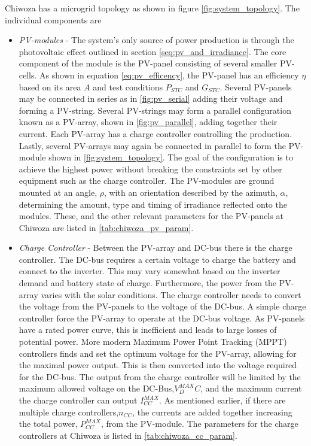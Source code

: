 Chiwoza has a microgrid topology as shown in figure \ref{fig:system_topology}. The individual components are
\begin{itemize}
    \item \textit{PV-modules}   -   The system's only source of power production is through the photovoltaic effect outlined in section \ref{seq:pv_and_irradiance}. The core component of the module is the PV-panel consisting of several smaller PV-cells. As shown in equation \ref{eq:pv_efficency}, the PV-panel has an efficiency $\eta$ based on its area $A$ and test conditions $P_{STC}$ and $G_{STC}$. Several PV-panels may be connected in series as in \ref{fig:pv_serial} adding their voltage and forming a PV-string. Several PV-strings may form a parallel configuration known as a PV-array, shown in \ref{fig:pv_parallel},  adding together their current. Each PV-array has a charge controller controlling the production. Lastly, several PV-arrays may again be connected in parallel to form the PV-module shown in \ref{fig:system_topology}. The goal of the configuration is to achieve the highest power without breaking the constraints set by other equipment such as the charge controller. The PV-modules are ground mounted at an angle, $\rho$, with an orientation described by the azimuth, $\alpha$, determining the amount, type and timing of irradiance reflected onto the modules. These, and the other relevant parameters for the PV-panels at Chiwoza are listed in \autoref{tab:chiwoza_pv_param}.
    
    \item \textit{Charge Controller}   -   Between the PV-array and DC-bus there is the charge controller. The DC-bus requires a certain voltage to charge the battery and connect to the inverter. This may vary somewhat based on the inverter demand and battery state of charge. Furthermore, the power from the PV-array varies with the solar conditions. The charge controller needs to convert the voltage from the PV-panels to the voltage of the DC-bus. A simple charge controller force the PV-array to operate at the DC-bus voltage. As PV-panels have a rated power curve, this is inefficient and leads to large losses of potential power. More modern Maximum Power Point Tracking (MPPT) controllers finds and set the optimum voltage for the PV-array, allowing for the maximal power output. This is then converted into the voltage required for the DC-bus.\cite{Svarc2022-oh} The output from the charge controller will be limited by the maximum allowed voltage on the DC-Bus,$V^{MAX}_DC$, and the maximum current the charge controller can output $I^{MAX}_{CC}$. As mentioned earlier, if there are multiple charge controllers,$n_{CC}$, the currents are added together increasing the total power, $P^{MAX}_{CC}$, from the PV-module. The parameters for the charge controllers  at Chiwoza is listed in \autoref{tab:chiwoza_cc_param}.
    

\end{itemize}
